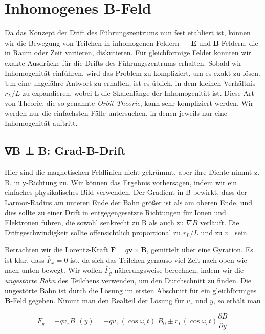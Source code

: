 \documentclass[
  a4paper,
  DIV=11]{scrreprt}
\begin{document}
\hypertarget{inhomogenes-b-feld}{%
\section{Inhomogenes B-Feld}\label{inhomogenes-b-feld}}

Da das Konzept der Drift des Führungszentrums nun fest etabliert ist,
können wir die Bewegung von Teilchen in inhomogenen Feldern ---
\(\mathbf{E}\) und \(\mathbf{B}\) Feldern, die in Raum oder Zeit
variieren, diskutieren. Für gleichförmige Felder konnten wir exakte
Ausdrücke für die Drifts des Führungszentrums erhalten. Sobald wir
Inhomogenität einführen, wird das Problem zu kompliziert, um es exakt zu
lösen. Um eine ungefähre Antwort zu erhalten, ist es üblich, in dem
kleinen Verhältnis \(r_L/L\) zu expandieren, wobei L die Skalenlänge der
Inhomogenität ist. Diese Art von Theorie, die so genannte
\emph{Orbit-Theorie}, kann sehr kompliziert werden. Wir werden nur die
einfachsten Fälle untersuchen, in denen jeweils nur eine Inhomogenität
auftritt.

\hypertarget{b-b-grad-b-drift}{%
\subsection{∇B ⊥ B: Grad-B-Drift}\label{b-b-grad-b-drift}}

Hier sind die magnetischen Feldlinien nicht gekrümmt, aber ihre Dichte
nimmt z. B. in y-Richtung zu. Wir können das Ergebnis vorhersagen, indem
wir ein einfaches physikalisches Bild verwenden. Der Gradient in
\textbar B\textbar{} bewirkt, dass der Larmor-Radius am unteren Ende der
Bahn größer ist als am oberen Ende, und dies sollte zu einer Drift in
entgegengesetzte Richtungen für Ionen und Elektronen führen, die sowohl
senkrecht zu B als auch zu \(\nabla B\) verläuft. Die
Driftgeschwindigkeit sollte offensichtlich proportional zu \(r_L/L\) und
zu \(v_\perp\) sein.

Betrachten wir die Lorentz-Kraft
\(\mathbf{F} = q\mathbf{v}\times\mathbf{B}\), gemittelt über eine
Gyration. Es ist klar, dass \(\bar{F}_x = 0\) ist, da sich das Teilchen
genauso viel Zeit nach oben wie nach unten bewegt. Wir wollen
\(\bar{F}_y\) näherungsweise berechnen, indem wir die \emph{ungestörte
Bahn} des Teilchens verwenden, um den Durchschnitt zu finden. Die
ungestörte Bahn ist durch die Lösung im ersten Abschnitt für ein
gleichförmiges \(\mathbf{B}\)-Feld gegeben. Nimmt man den Realteil der
Lösung für \(v_x\) und \(y\), so erhält man

\[
F_y = -q v_x B_z(y) = -q v_\perp(\cos \omega_c t) \Big[ B_0 \pm r_L(\cos\omega_c t )\frac{\partial B}{\partial y} \Big]
\]
\end{document}
